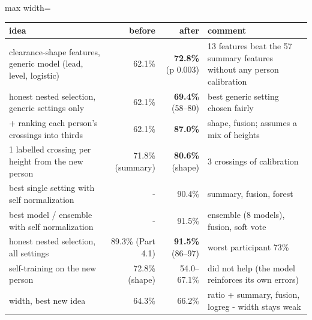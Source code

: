 \begin{adjustbox}{max width=\textwidth}
{\footnotesize
\begin{tabular}{p{5.2cm}rrp{6.2cm}}
\toprule
\textbf{idea} & \textbf{before} & \textbf{after} & \textbf{comment} \\
\midrule
clearance-shape features, generic model (lead, level, logistic) & 62.1\% & \textbf{72.8\%} (p 0.003) & 13 features beat the 57 summary features without any person calibration \\
honest nested selection, generic settings only & 62.1\% & \textbf{69.4\%} (58--80) & best generic setting chosen fairly \\
+ ranking each person's crossings into thirds & 62.1\% & \textbf{87.0\%} & shape, fusion; assumes a mix of heights \\
1 labelled crossing per height from the new person & 71.8\% (summary) & \textbf{80.6\%} (shape) & 3 crossings of calibration \\
best single setting with self normalization & - & 90.4\% & summary, fusion, forest \\
best model / ensemble with self normalization & - & 91.5\% & ensemble (8 models), fusion, soft vote \\
honest nested selection, all settings & 89.3\% (Part 4.1) & \textbf{91.5\%} (86--97) & worst participant 73\% \\
self-training on the new person & 72.8\% (shape) & 54.0--67.1\% & did not help (the model reinforces its own errors) \\
width, best new idea & 64.3\% & 66.2\% & ratio + summary, fusion, logreg - width stays weak \\
\bottomrule
\end{tabular}
}
\end{adjustbox}
